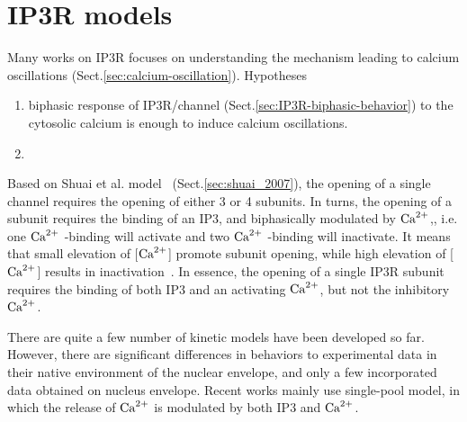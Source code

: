 
\chapter{IP3R models}
\label{chap:ip3r-models}

\def\er{{\text{ER}}}
\def\cyto{{\text{cyto}}}

Many works on IP3R focuses on understanding the mechanism leading to calcium
oscillations (Sect.\ref{sec:calcium-oscillation}). Hypotheses
\begin{enumerate}
  \item biphasic response of IP3R/channel
  (Sect.\ref{sec:IP3R-biphasic-behavior}) to the cytosolic calcium is enough to
  induce calcium oscillations.
  
  \item 
\end{enumerate}

Based on Shuai et al. model~  \citep{shuai2007kmip3r}
(Sect.\ref{sec:shuai_2007}), the opening of a single channel requires the
opening of either 3 or 4 subunits. In turns, the opening of a subunit requires
the binding of an IP3, and biphasically modulated by  ${\text{Ca}^{2+}}$,, i.e. one ${\text{Ca}^{2+}}$
-binding will activate and two ${\text{Ca}^{2+}}$ -binding will inactivate. It means that
small elevation of [${\text{Ca}^{2+}}$] promote subunit opening, while high elevation of
[${\text{Ca}^{2+}}$] results in inactivation~\citep{bezprozvanny1991ip3r}.
In essence, the opening of a single IP3R subunit requires the binding of both
IP3 and an activating  ${\text{Ca}^{2+}}$, but not the inhibitory  ${\text{Ca}^{2+}}$. 

There are quite a few number of kinetic models have been developed so
far\citep{atri1993spm}. However, there are significant differences in
behaviors to experimental data in their native environment of the
nuclear envelope, and only a few incorporated data obtained on nucleus
envelope. Recent works mainly use single-pool model, in which the release of
 ${\text{Ca}^{2+}}$ is modulated by both IP3 and  ${\text{Ca}^{2+}}$. 


% 
% 
% 
% 
% 

